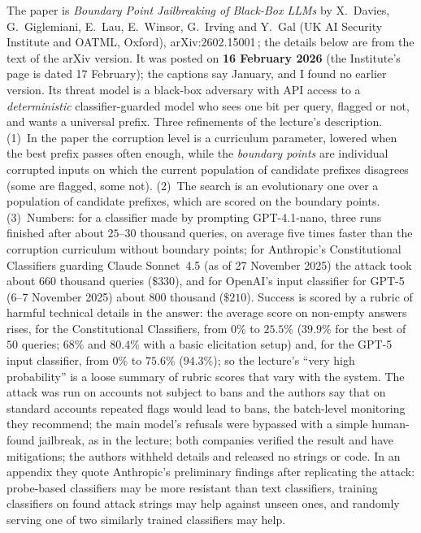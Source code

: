 \begin{beyond}
The paper is \emph{Boundary Point Jailbreaking of Black-Box LLMs} by X.~Davies, G.~Giglemiani, E.~Lau, E.~Winsor, G.~Irving and Y.~Gal (UK AI Security Institute and OATML, Oxford), arXiv:2602.15001\,\citep{aisi2026bpj}; the details below are from the text of the arXiv version. It was posted on \textbf{16 February 2026} (the Institute's page is dated 17 February); the captions say January, and I found no earlier version. Its threat model is a black-box adversary with API access to a \emph{deterministic} classifier-guarded model who sees one bit per query, flagged or not, and wants a universal prefix. Three refinements of the lecture's description. (1)~In the paper the corruption level is a curriculum parameter, lowered when the best prefix passes often enough, while the \emph{boundary points} are individual corrupted inputs on which the current population of candidate prefixes disagrees (some are flagged, some not). (2)~The search is an evolutionary one over a population of candidate prefixes, which are scored on the boundary points. (3)~Numbers: for a classifier made by prompting GPT-4.1-nano, three runs finished after about $25$--$30$ thousand queries, on average five times faster than the corruption curriculum without boundary points; for Anthropic's Constitutional Classifiers guarding Claude Sonnet~4.5 (as of 27 November 2025) the attack took about $660$ thousand queries ($\$330$), and for OpenAI's input classifier for GPT-5 (6--7 November 2025) about $800$ thousand ($\$210$). Success is scored by a rubric of harmful technical details in the answer: the average score on non-empty answers rises, for the Constitutional Classifiers, from $0\%$ to $25.5\%$ ($39.9\%$ for the best of $50$ queries; $68\%$ and $80.4\%$ with a basic elicitation setup) and, for the GPT-5 input classifier, from $0\%$ to $75.6\%$ ($94.3\%$); so the lecture's ``very high probability'' is a loose summary of rubric scores that vary with the system. The attack was run on accounts not subject to bans and the authors say that on standard accounts repeated flags would lead to bans, the batch-level monitoring they recommend; the main model's refusals were bypassed with a simple human-found jailbreak, as in the lecture; both companies verified the result and have mitigations; the authors withheld details and released no strings or code. In an appendix they quote Anthropic's preliminary findings after replicating the attack: probe-based classifiers may be more resistant than text classifiers, training classifiers on found attack strings may help against unseen ones, and randomly serving one of two similarly trained classifiers may help.
\end{beyond}


